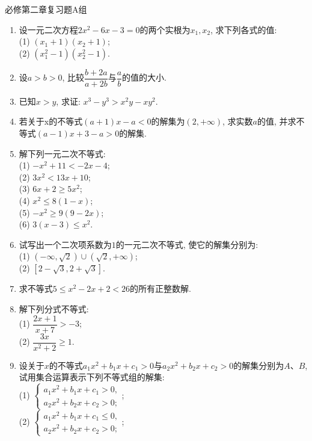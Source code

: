 \documentclass[10pt,a4paper]{article}
\begin{document}
必修第二章复习题A组
\begin{enumerate}[1.]

\item 设一元二次方程$2x^2-6x-3=0$的两个实根为$x_1,x_2$, 求下列各式的值:\\
(1) $(x_1+1)(x_2+1)$;\\
(2) $(x_1^2-1)(x_2^2-1)$.
\vspace*{3cm}
\item 设$a>b>0$, 比较$\dfrac{b+2a}{a+2b}$与$\dfrac ab$的值的大小.
\vspace*{3cm}
\item 已知$x>y$, 求证: $x^3-y^3>x^2y-xy^2$.
\vspace*{3cm}
\item 若关于x的不等式$(a+1)x-a<0$的解集为$(2,+\infty)$, 求实数$a$的值, 并求不等式$(a-1)x+3-a>0$的解集.
\vspace*{3cm}
\item 解下列一元二次不等式:\\
(1) $-x^2+11<-2x-4$;\\
(2) $3x^2<13x+10$;\\
(3) $6x+2\ge 5x^2$;\\
(4) $x^2\le 8(1-x)$;\\
(5) $-x^2\ge 9(9-2x)$;\\
(6) $3(x-3)\le x^2$.
\vspace*{3cm}
\item 试写出一个二次项系数为$1$的一元二次不等式, 使它的解集分别为:\\
(1) $(-\infty, \sqrt 2)\cup  (\sqrt 2, +\infty)$;\\
(2) $[2-\sqrt 3, 2+\sqrt 3]$.
\vspace*{3cm}
\item 求不等式$5\le x^2-2x+2<26$的所有正整数解.
\vspace*{3cm}
\item 解下列分式不等式:\\
(1) $\dfrac{2x+1}{x+7}>-3$;\\
(2) $\dfrac{3x}{x^2+2}\ge 1$.
\vspace*{3cm}
\item 设关于$x$的不等式$a_1x^2+b_1x+c_1>0$与$a_2x^2+b_2x+c_2>0$的解集分别为$A$、$B$,
试用集合运算表示下列不等式组的解集:\\
(1) $\begin{cases} a_1x^2+b_1x+c_1>0, \\ a_2x^2+b_2x+c_2>0;\end{cases}$;\\
(2) $\begin{cases} a_1x^2+b_1x+c_1\le 0, \\ a_2x^2+b_2x+c_2>0;\end{cases}$;\\

\end{enumerate}
\end{document}
